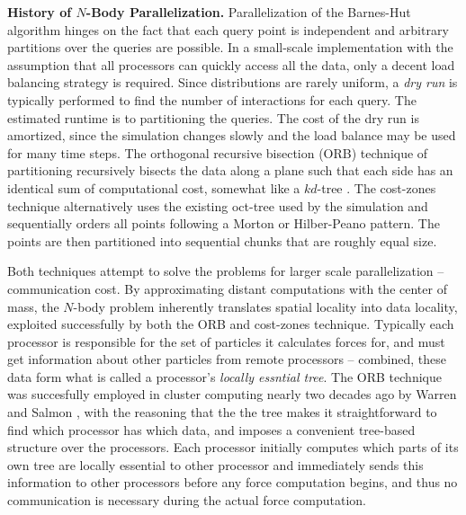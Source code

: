 \documentclass[times, leqno,twocolumn]{article}
\begin{document}

{\bf History of $N$-Body Parallelization.}
Parallelization of the Barnes-Hut algorithm hinges on the fact that each query point is independent and arbitrary partitions over the queries are possible.
In a small-scale implementation with the assumption that all processors can quickly access all the data, only a decent load balancing strategy is required.
Since distributions are rarely uniform, a {\it dry run} is typically performed to find the number of interactions for each query.
The estimated runtime is to partitioning the queries.
The cost of the dry run is amortized, since the simulation changes slowly and the load balance may be used for many time steps.
The orthogonal recursive bisection (ORB) technique of partitioning recursively bisects the data along a plane such that each side has an identical sum of computational cost, somewhat like a $kd$-tree \cite{singh95load, liu94experiences, salmon93parallel}.
The cost-zones technique alternatively uses the existing oct-tree used by the simulation and sequentially orders all points following a Morton or Hilber-Peano pattern.
The points are then partitioned into sequential chunks that are roughly equal size.

Both techniques attempt to solve the problems for larger scale parallelization -- communication cost.
By approximating distant computations with the center of mass, the $N$-body problem inherently translates spatial locality into data locality, exploited successfully by both the ORB and cost-zones technique.
Typically each processor is responsible for the set of particles it calculates forces for, and must get information about other particles from remote processors -- combined, these data form what is called a processor's {\it locally essntial tree}.
The ORB technique was succesfully employed in cluster computing nearly two decades ago by Warren and Salmon \cite{warren92astrophysical}, with the reasoning that the the tree makes it straightforward to find which processor has which data, and imposes a convenient tree-based structure over the processors.
Each processor initially computes which parts of its own tree are locally essential to other processor and immediately sends this information to other processors before any force computation begins, and thus no communication is necessary during the actual force computation.
\end{document}
